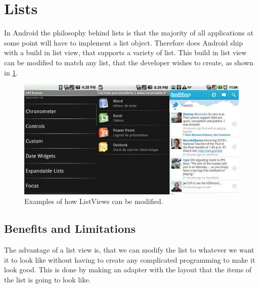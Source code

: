 \section{Lists}
In Android the philosophy behind lists is that the majority of all applications at some point will have to implement a list object.
Therefore does Android ship with a build in list view, that supports a variety of list.
This build in list view can be modified to match any list, that the developer wishes to create, as shown in \ref{fig:listview_example}.

\begin{figure}[H]
	\centering
		\includegraphics[width=\textwidth]{Images/Implementation/listview_example.png}
	\caption{Examples of how ListViews can be modified.}
	\label{fig:listview_example}
\end{figure}

\subsection{Benefits and Limitations}
The advantage of a list view is, that we can modify the list to whatever we want it to look like without having to create any complicated programming to make it look good.
This is done by making an adapter with the layout that the items of the list is going to look like.

